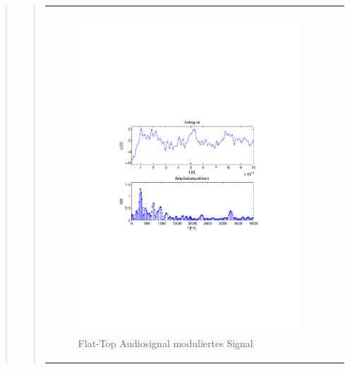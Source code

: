 \begin{quote}
\begin{quote}
\begin{center}
\begin{tabular}{ll}
            \hspace{-5cm}
                \begin{minipage}{0.6\textwidth}
                    \begin{figure}[H]
                        \includegraphics[scale=0.55, trim = 16mm 70mm 16mm 85mm, clip]{Bilder/audioflatabget_zeit}
                          \caption{Flat-Top Audiosignal moduliertes Signal}
		                  \label{fig:flataudiozeit}
                    \end{figure}
                \end{minipage}
                

\end{tabular}
\end{center}
\end{quote}
\end{quote}
